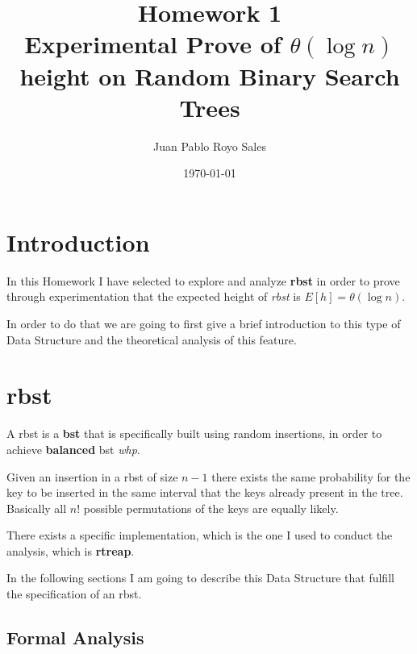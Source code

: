 \documentclass[12pt, a4paper]{article}
\title{%
      Homework 1 \\
      Experimental Prove of $\theta(\log n)$ height on Random Binary Search Trees
}
\author{Juan Pablo Royo Sales}
\date\today
\begin{document}
\maketitle

\section{Introduction}
In this Homework I have selected to explore and analyze \textbf{\acrfull{rbst}} in order to prove through experimentation that the expected height of \textit{\acrshort{rbst}} is $E[h] = \theta(\log n)$.

In order to do that we are going to first give a brief introduction to this type of Data Structure and the theoretical analysis of this feature.

\section{\acrlong{rbst}}
A \acrshort{rbst} is a \textbf{\acrfull{bst}} that is specifically built using random insertions, in order to achieve \textbf{balanced} \acrshort{bst} \textit{whp}.

Given an insertion in a \acrshort{rbst} of size $n - 1$ there exists the same probability for the key to be inserted in the same interval that the keys already present in the tree. Basically all $n{!}$ possible permutations of the keys are equally likely.

There exists a specific implementation, which is the one I used to conduct the analysis, which is \textbf{\acrfull{rtreap}}.

In the following sections I am going to describe this Data Structure that fulfill the specification of an \acrshort{rbst}.

\subsection{Formal Analysis}


\printglossary[type=\acronymtype]
\end{document}
